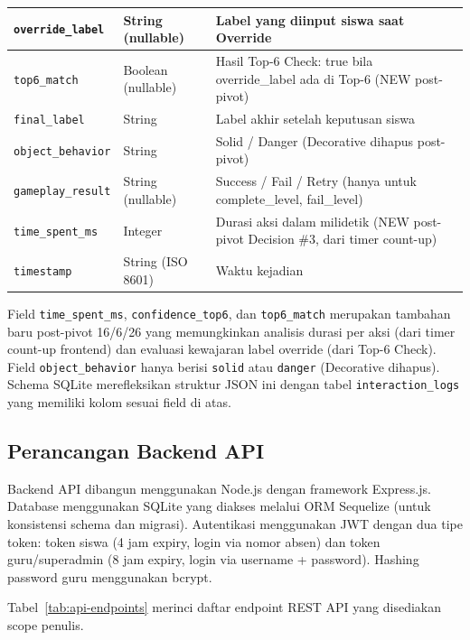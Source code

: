 \documentclass[12pt,a4paper,oneside,openany]{report}
\begin{document}
\begin{table}[H]
\begin{tabular}{|p{3.5cm}|p{2.5cm}|p{7cm}|}
\texttt{override\_label} & String (nullable) & Label yang diinput siswa saat Override \\ \hline
\texttt{top6\_match} & Boolean (nullable) & Hasil Top-6 Check: true bila override\_label ada di Top-6 (NEW post-pivot) \\ \hline
\texttt{final\_label} & String & Label akhir setelah keputusan siswa \\ \hline
\texttt{object\_behavior} & String & Solid / Danger (Decorative dihapus post-pivot) \\ \hline
\texttt{gameplay\_result} & String (nullable) & Success / Fail / Retry (hanya untuk complete\_level, fail\_level) \\ \hline
\texttt{time\_spent\_ms} & Integer & Durasi aksi dalam milidetik (NEW post-pivot Decision \#3, dari timer count-up) \\ \hline
\texttt{timestamp} & String (ISO 8601) & Waktu kejadian \\ \hline
\end{tabular}
\end{table}

Field \texttt{time\_spent\_ms}, \texttt{confidence\_top6}, dan \texttt{top6\_match} merupakan tambahan baru post-pivot 16/6/26 yang memungkinkan analisis durasi per aksi (dari timer count-up frontend) dan evaluasi kewajaran label override (dari Top-6 Check). Field \texttt{object\_behavior} hanya berisi \texttt{solid} atau \texttt{danger} (Decorative dihapus). Schema SQLite merefleksikan struktur JSON ini dengan tabel \texttt{interaction\_logs} yang memiliki kolom sesuai field di atas.

\subsection{Perancangan Backend API}
\label{subsec:backend-api}

Backend API dibangun menggunakan Node.js dengan framework Express.js. Database menggunakan SQLite yang diakses melalui ORM Sequelize (untuk konsistensi schema dan migrasi). Autentikasi menggunakan JWT dengan dua tipe token: token siswa (4 jam expiry, login via nomor absen) dan token guru/superadmin (8 jam expiry, login via username + password). Hashing password guru menggunakan bcrypt.

Tabel~\ref{tab:api-endpoints} merinci daftar endpoint REST API yang disediakan scope penulis.
\end{document}
